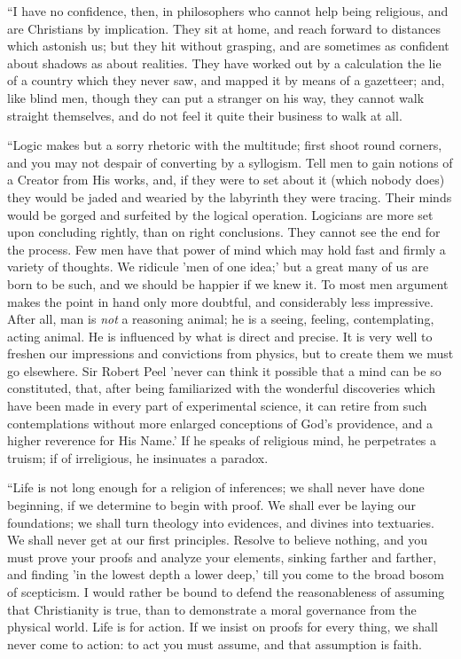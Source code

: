 ``I have no confidence, then, in philosophers who cannot help
being religious, and are Christians by implication. They sit at home,
and reach forward to distances which astonish us; but they hit without
grasping, and are sometimes as confident about shadows as about
realities. They have worked out by a calculation the lie of a country
which they never saw, and mapped it by means of a gazetteer; and, like
blind men, though they can put a stranger on his way, they cannot
walk straight themselves, and do not feel it quite their business to
walk at all.

``Logic makes but a sorry rhetoric with the multitude; first
shoot round corners, and you may not despair of converting by a
syllogism. Tell men to gain notions of a Creator from His works, and,
if they were to set about it (which nobody does) they would be jaded
and wearied by the labyrinth they were tracing. Their minds would be
gorged and surfeited by the logical operation. Logicians are more set
upon concluding rightly, than on right conclusions. They cannot see
the end for the process. Few men have that power of mind which may
hold fast and firmly a variety of thoughts. We ridicule 'men of one
idea;' but a great many of us are born to be such, and we should be
happier if we knew it. To most men argument makes the point in hand
only more doubtful, and considerably less impressive. After all, man
is \emph{not} a reasoning animal; he is a seeing, feeling, contemplating,
acting animal. He is influenced by what is direct and precise. It is
very well to freshen our impressions and convictions from physics, but
to create them we must go elsewhere. Sir Robert Peel 'never can think
it possible that a mind can be so constituted, that, after being
familiarized with the wonderful discoveries which have been made in
every part of experimental science, it can retire from such
contemplations without more enlarged conceptions of God's
providence, and a higher reverence for His Name.' If he speaks of
religious mind, he perpetrates a truism; if of irreligious, he
insinuates a paradox.

``Life is not long enough for a religion of inferences; we
shall never have done beginning, if we determine to begin with proof.
We shall ever be laying our foundations; we shall turn theology into
evidences, and divines into textuaries. We shall never get at our
first principles. Resolve to believe nothing, and you must prove your
proofs and analyze your elements, sinking farther and farther, and
finding 'in the lowest depth a lower deep,' till you come to the broad
bosom of scepticism. I would rather be bound to defend the
reasonableness of assuming that Christianity is true, than to
demonstrate a moral governance from the physical world. Life is for
action. If we insist on proofs for every thing, we shall never come to
action: to act you must assume, and that assumption is faith.

